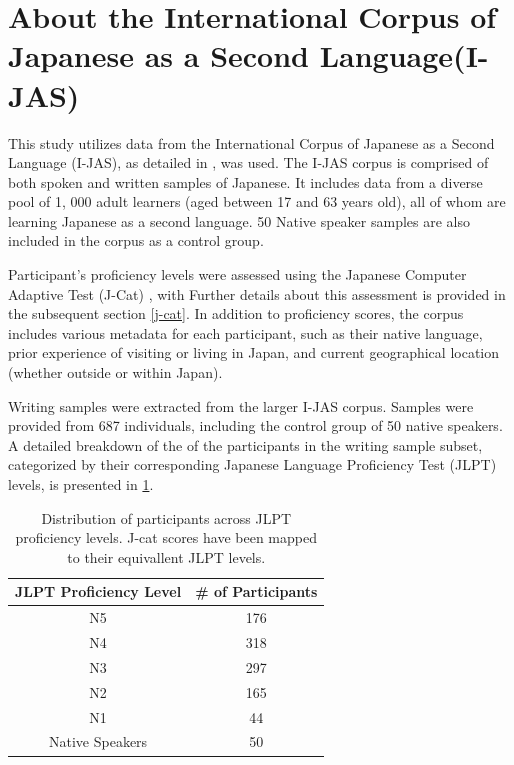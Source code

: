 \section{About the International Corpus of Japanese as a Second Language(I-JAS)}

This study utilizes data from the International Corpus of Japanese as a Second Language (I-JAS), as
detailed in
\citet{Sakoda2020}, was
used.  The
I-JAS corpus is comprised of both spoken and written samples of Japanese.  It includes data from a diverse pool of 1,
000 adult learners
(aged
between 17 and 63 years old), all of whom are learning Japanese as a second language. 50 Native speaker samples are also
included in the corpus as a control group.

Participant's proficiency levels were assessed using the Japanese Computer Adaptive Test (J-Cat)
\citep{Imai2009}, with Further details about this assessment is provided in the
subsequent
section \ref{j-cat}. In addition to proficiency scores, the corpus includes various metadata for each participant,
such as
their
native language,
prior experience of visiting or living in Japan, and current geographical location (whether outside or within Japan).

Writing samples were extracted from the larger I-JAS corpus. Samples  were provided from 687 individuals, including the
control group
of 50 native speakers. A detailed breakdown of the of the participants in the writing sample subset, categorized by
their corresponding Japanese Language Proficiency Test (JLPT) levels, is presented in \ref{tab:participants-chart}.

\begin{table}[h!]
\centering
\begin{tabular}{cc}
\hline \textbf{JLPT Proficiency Level} & \textbf{\# of Participants} \\ \hline
N5 & 176 \\
N4  & 318 \\
N3 & 297\\
N2 & 165 \\
N1 & 44 \\
Native Speakers & 50 \\
\hline
\end{tabular}
\caption{Distribution of participants across JLPT proficiency levels. J-cat scores have been mapped to their equivallent JLPT levels. }
\label{tab:participants-chart}
\end{table}

